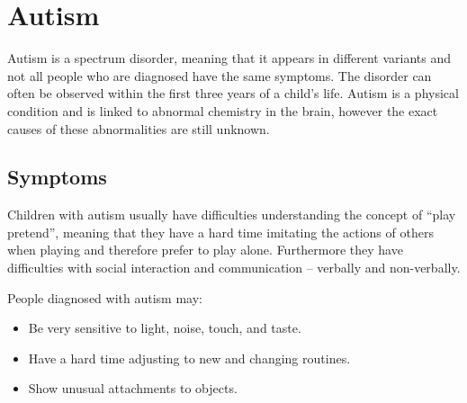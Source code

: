 \section{Autism}
\label{sec:autism}
Autism is a spectrum disorder, meaning that it appears in different variants and not all people who are diagnosed have the same symptoms. The disorder can often be observed within the first three years of a child's life.
Autism is a physical condition and is linked to abnormal chemistry in the brain, however the exact causes of these abnormalities are still unknown.\citep{autism}





\subsection*{Symptoms}
\label{sub:symptoms}
Children with autism usually have difficulties understanding the concept of ``play pretend'', meaning that they have a hard time imitating the actions of others when playing and therefore prefer to play alone. Furthermore they have difficulties with social interaction and communication -- verbally and non-verbally.

People diagnosed with autism may:


\begin{itemize}
\item Be very sensitive to light, noise, touch, and taste.
\item Have a hard time adjusting to new and changing routines.
\item Show unusual attachments to objects.
\end{itemize}

